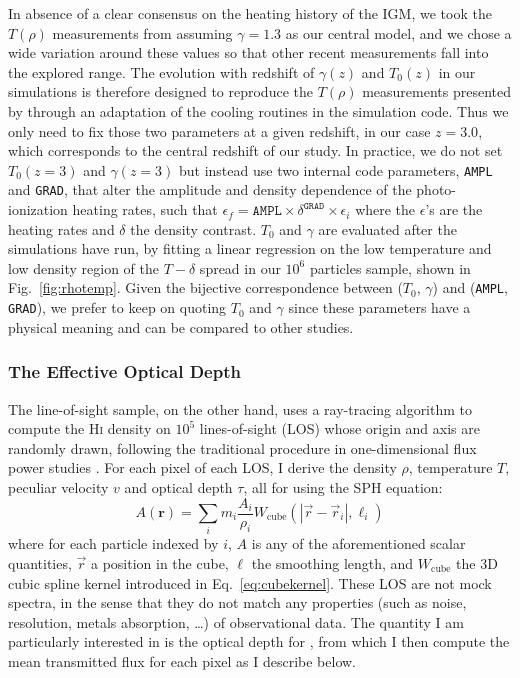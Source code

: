 In absence of a clear consensus on the heating history of the IGM, we took the $T(\rho)$ measurements from \citet{Becker2011}
assuming $\gamma = 1.3$ as our central model, and we chose a wide variation around these values so that other recent measurements
\citep{Garzilli2012, Lidz2010, Schaye2000} fall into the explored range.
The evolution with redshift of $\gamma(z)$ and $T_0(z)$ in our simulations is therefore designed to reproduce the $T(\rho)$ measurements presented by
\citet{Becker2011} through an adaptation of the cooling routines in the simulation
code. Thus we only need to fix those two parameters at a given redshift, in our case $z=3.0$, which corresponds to the  central redshift
of our study. In practice, we do not set $T_0(z=3)$ and $\gamma (z=3)$ but instead use two internal code parameters, \texttt{AMPL} and 
\texttt{GRAD}, that alter the amplitude and  density dependence of the photo-ionization heating rates, such that
$\epsilon_f = \mathtt{AMPL} \times \delta^{\mathtt{GRAD}} \times \epsilon_i$ where the $\epsilon$'s are the heating rates and $\delta$ the
density contrast. $T_0$ and $\gamma$ are evaluated after the simulations have run, by fitting a linear regression on the low temperature and low density region of the $T-\delta$ spread in our $10^6$ particles sample, shown in Fig.~\ref{fig:rhotemp}. Given the bijective correspondence between ($T_0$, $\gamma$) and (\texttt{AMPL}, 
\texttt{GRAD}), we prefer to keep on quoting  $T_0$ and $\gamma$  since these parameters have a physical meaning and can be compared to other studies. \\

\subsubsection{The Effective Optical Depth}
\label{sec:los_sample}

The line-of-sight sample, on the other hand, uses a ray-tracing algorithm to compute the \textsc{Hi} density on $10^5$ lines-of-sight (LOS) whose origin and axis are randomly drawn, following the traditional procedure in one-dimensional flux power studies \citep{Croft2002, Gnedin2002}. For each pixel of each LOS, I derive the density
$\rho$, temperature $T$, peculiar velocity $v$ and optical depth $\tau$, all for  using the SPH equation:
\begin{equation}
A(\mathbf{r}) = \sum\limits_{i} m_i \frac{A_i}{\rho_i} W_{\mathrm{cube}} \left( \left\vert \vec{r} - \vec{r}_i \right\vert, \ell_i \right)
\end{equation} where for each particle indexed by $i$, $A$ is any of the aforementioned scalar quantities, $\vec{r}$ a position in the cube, $\ell$ the smoothing length, and $W_{\mathrm{cube}}$ the 3D cubic spline kernel introduced in Eq.~\ref{eq:cubekernel}. These LOS are not mock spectra, in the sense that they do not match any
properties (such as noise, resolution, metals absorption, \dots) of observational data. The quantity I am particularly interested in is the optical depth for , from which I then compute the mean transmitted flux for each pixel as I describe below.\\

